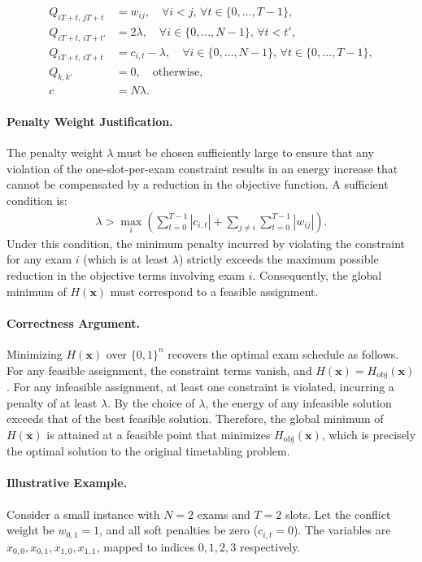 \documentclass[12pt]{article}
\begin{document}
\begin{align}
    Q_{iT+t, \, jT+t} &= w_{ij}, \quad \forall i < j, \, \forall t \in \{0, \dots, T-1\}, \\
    Q_{iT+t, \, iT+t'} &= 2\lambda, \quad \forall i \in \{0, \dots, N-1\}, \, \forall t < t', \\
    Q_{iT+t, \, iT+t} &= c_{i,t} - \lambda, \quad \forall i \in \{0, \dots, N-1\}, \, \forall t \in \{0, \dots, T-1\}, \\
    Q_{k, k'} &= 0, \quad \text{otherwise}, \\
    c &= N \lambda.
\end{align}

\paragraph{Penalty Weight Justification.}
The penalty weight $\lambda$ must be chosen sufficiently large to ensure that any violation of the one-slot-per-exam constraint results in an energy increase that cannot be compensated by a reduction in the objective function. A sufficient condition is:
\begin{align}
    \lambda > \max_{i} \left( \sum_{t=0}^{T-1} |c_{i,t}| + \sum_{j \neq i} \sum_{t=0}^{T-1} |w_{ij}| \right).
\end{align}
Under this condition, the minimum penalty incurred by violating the constraint for any exam $i$ (which is at least $\lambda$) strictly exceeds the maximum possible reduction in the objective terms involving exam $i$. Consequently, the global minimum of $H(\mathbf{x})$ must correspond to a feasible assignment.

\paragraph{Correctness Argument.}
Minimizing $H(\mathbf{x})$ over $\{0,1\}^n$ recovers the optimal exam schedule as follows. For any feasible assignment, the constraint terms vanish, and $H(\mathbf{x}) = H_{\text{obj}}(\mathbf{x})$. For any infeasible assignment, at least one constraint is violated, incurring a penalty of at least $\lambda$. By the choice of $\lambda$, the energy of any infeasible solution exceeds that of the best feasible solution. Therefore, the global minimum of $H(\mathbf{x})$ is attained at a feasible point that minimizes $H_{\text{obj}}(\mathbf{x})$, which is precisely the optimal solution to the original timetabling problem.

\paragraph{Illustrative Example.}
Consider a small instance with $N=2$ exams and $T=2$ slots. Let the conflict weight be $w_{0,1} = 1$, and all soft penalties be zero ($c_{i,t} = 0$). The variables are $x_{0,0}, x_{0,1}, x_{1,0}, x_{1,1}$, mapped to indices $0, 1, 2, 3$ respectively.
\end{document}

